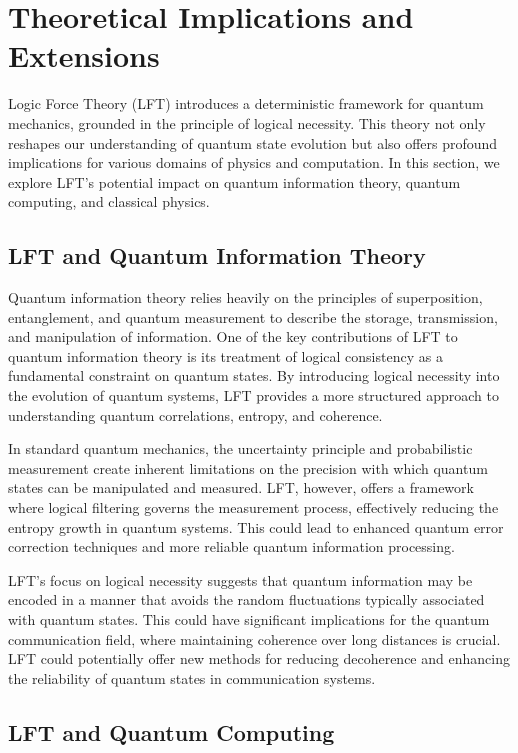 \section{Theoretical Implications and Extensions}

Logic Force Theory (LFT) introduces a deterministic framework for quantum mechanics, grounded in the principle of logical necessity. This theory not only reshapes our understanding of quantum state evolution but also offers profound implications for various domains of physics and computation. In this section, we explore LFT’s potential impact on quantum information theory, quantum computing, and classical physics.

\subsection{LFT and Quantum Information Theory}

Quantum information theory relies heavily on the principles of superposition, entanglement, and quantum measurement to describe the storage, transmission, and manipulation of information. One of the key contributions of LFT to quantum information theory is its treatment of logical consistency as a fundamental constraint on quantum states. By introducing logical necessity into the evolution of quantum systems, LFT provides a more structured approach to understanding quantum correlations, entropy, and coherence.

In standard quantum mechanics, the uncertainty principle and probabilistic measurement create inherent limitations on the precision with which quantum states can be manipulated and measured. LFT, however, offers a framework where logical filtering governs the measurement process, effectively reducing the entropy growth in quantum systems. This could lead to enhanced quantum error correction techniques and more reliable quantum information processing.

LFT’s focus on logical necessity suggests that quantum information may be encoded in a manner that avoids the random fluctuations typically associated with quantum states. This could have significant implications for the quantum communication field, where maintaining coherence over long distances is crucial. LFT could potentially offer new methods for reducing decoherence and enhancing the reliability of quantum states in communication systems.

\subsection{LFT and Quantum Computing}

